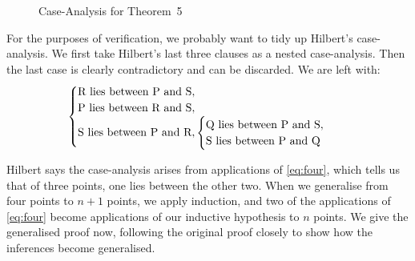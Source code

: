 \begin{figure}
\caption{Case-Analysis for Theorem~5}
\label{fig:Theorem5Cases}
\end{figure}

For the purposes of verification, we probably want to tidy up Hilbert's case-analysis. We first take Hilbert's last three clauses as a nested case-analysis. Then the last case is clearly contradictory and can be discarded. We are left with:
\begin{displaymath}
\begin{cases}
$R$ \text{ lies between } $P$ \text{ and } $S$,\\
$P$ \text{ lies between } $R$ \text{ and } $S$,\\
$S$ \text{ lies between } $P$ \text{ and } $R$,
\begin{cases}
  $Q$ \text{ lies between } $P$ \text{ and } $S$,\\
  $S$ \text{ lies between } $P$ \text{ and } $Q$
\end{cases}
\end{cases}
\end{displaymath}

Hilbert says the case-analysis arises from applications of \ref{eq:four}, which tells us that of three points, one lies between the other two. When we generalise from four points to $n+1$ points, we apply induction, and two of the applications of \ref{eq:four} become applications of our inductive hypothesis to $n$ points. We give the generalised proof now, following the original proof closely to show how the inferences become generalised.

